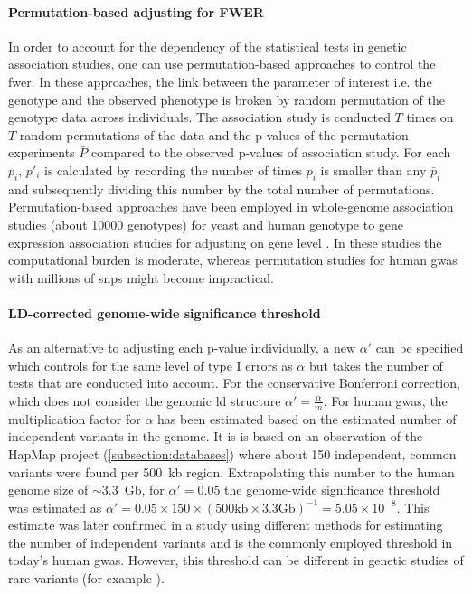 \paragraph{Permutation-based adjusting for FWER}
In order to account for the dependency of the statistical tests in genetic association studies, one can use permutation-based approaches to control the \gls{fwer}. In these approaches, the link between the parameter of interest i.e. the genotype and the observed phenotype is broken by random permutation of the genotype data across individuals.  The association study is conducted \(T\) times on \(T\)  random permutations of the data and the p-values of the permutation experiments \(\bar{P}\) compared to the observed p-values of association study. For each \(p_i\),   \(p'_i\)  is calculated by recording the number of times \(p_i\) is smaller than any \(\bar{p}_i\) and subsequently dividing this number by the total number of permutations. Permutation-based approaches have been employed in whole-genome association studies (about \num{10000} genotypes) for yeast \citep{Brem2002,Ehrenreich2010,Bloom2013} and human genotype to gene expression association studies for adjusting on gene level \citep{1000Genomes2015}. In these studies the computational burden is moderate, whereas permutation studies for human \gls{gwas} with millions of \glspl{snp} might become impractical. 

\paragraph{LD-corrected genome-wide significance threshold}
As an alternative to adjusting each p-value individually, a new \(\alpha '\) can be specified which controls for the same level of type I errors as \(\alpha\) but takes the number of tests that are conducted into account. For the conservative Bonferroni correction, which does not consider the genomic \gls{ld} structure \(\alpha ' = \frac{\alpha}{m}\). 
For human \gls{gwas}, the multiplication factor for \(\alpha \) has been estimated based on the estimated number of independent variants in the genome.  It is is based on an observation of the HapMap project \citep{HapMap2005} (\cref{subsection:databases}) where about \num{150} independent, common variants were found per \num{500}~kb region.  Extrapolating this number to the human genome size of \(\sim 3.3\)~Gb, for \(\alpha ' =0.05\) the genome-wide significance threshold was estimated as  \(\alpha '= 0.05 \times 150 \times \left(500\text{kb} \times 3.3 \text{Gb}\right)^{-1}= 5.05 \times 10^{-8}\). This estimate was later confirmed in a study using different methods for estimating the number of independent variants \citep{Fadista2016} and is the commonly employed threshold in today's human \gls{gwas}. However, this threshold can be different in genetic studies of rare variants (for example \citep{Xu2014}).

